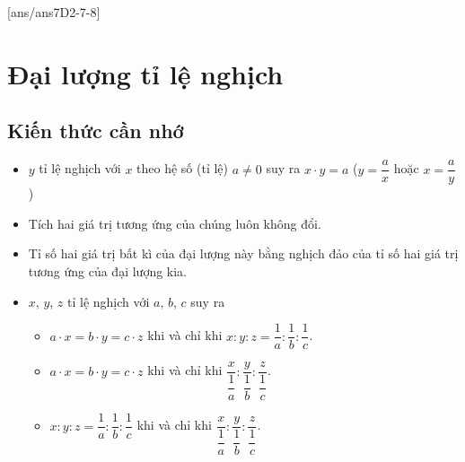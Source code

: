 [ans/ans7D2-7-8]


\section{Đại lượng tỉ lệ nghịch}
\subsection{Kiến thức cần nhớ}
\begin{note}
	\begin{itemize}
		\item $y$ tỉ lệ nghịch với $x$ theo hệ số (tỉ lệ) $a\neq 0$ suy ra $x\cdot y = a$ ($y = \dfrac{a}{x}$ hoặc $x = \dfrac{a}{y}$)
		\item Tích hai giá trị tương ứng của chúng luôn không đổi.
		\item Tỉ số hai giá trị bất kì của đại lượng này bằng nghịch đảo của tỉ số hai giá trị tương ứng của đại lượng kia.
		\item $x$, $y$, $z$ tỉ lệ nghịch với $a$, $b$, $c$ suy ra 
		\begin{itemize}
			\item $a\cdot x = b\cdot y = c\cdot z$ khi và chỉ khi $x\colon y\colon z = \dfrac{1}{a}\colon \dfrac{1}{b}\colon \dfrac{1}{c}$.
			\item $a\cdot x = b\cdot y = c\cdot z$ khi và chỉ khi $\dfrac{x}{\dfrac{1}{a}}\colon \dfrac{y}{\dfrac{1}{b}}\colon \dfrac{z}{\dfrac{1}{c}}$.
			\item  $x\colon y\colon z = \dfrac{1}{a}\colon \dfrac{1}{b}\colon \dfrac{1}{c}$ khi và chỉ khi $\dfrac{x}{\dfrac{1}{a}}\colon \dfrac{y}{\dfrac{1}{b}}\colon \dfrac{z}{\dfrac{1}{c}}$.
		\end{itemize}
	\end{itemize}
\end{note}
